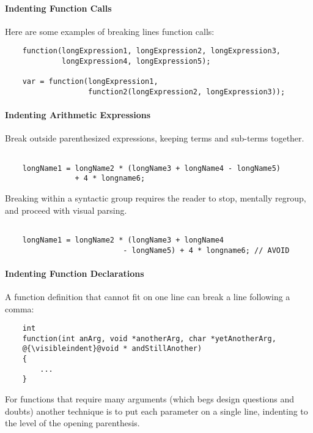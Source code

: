 \documentclass[fleqn,12pt]{PARCOneColumn} %
\newcommand{\visibleindent}{\textvisiblespace\textvisiblespace\textvisiblespace\textvisiblespace}
\begin{document}
\paragraph{Indenting Function Calls}
Here are some examples of breaking lines function calls:
\begin{lstlisting}
    function(longExpression1, longExpression2, longExpression3,
             longExpression4, longExpression5);

    var = function(longExpression1,
                   function2(longExpression2, longExpression3));

\end{lstlisting}

\paragraph{Indenting Arithmetic Expressions}
Break outside parenthesized expressions, keeping terms and sub-terms together.

\begin{lstlisting}

    longName1 = longName2 * (longName3 + longName4 - longName5)
                + 4 * longname6;

\end{lstlisting}

Breaking within a syntactic group requires the reader to stop, mentally regroup, and proceed with visual parsing.
\begin{lstlisting}[backgroundcolor=\color{badCodeColor}]

    longName1 = longName2 * (longName3 + longName4
                           - longName5) + 4 * longname6; // AVOID

\end{lstlisting}

\paragraph{Indenting Function Declarations}
A function definition that cannot fit on one line can break a line following a comma:

\begin{lstlisting}
    int
    function(int anArg, void *anotherArg, char *yetAnotherArg,
    @{\visibleindent}@void * andStillAnother)
    {
		...
    }
\end{lstlisting}

For functions that require many arguments
(which begs design questions and doubts)
another technique is to put each parameter on a single line,
indenting to the level of the opening parenthesis.
\end{document}
